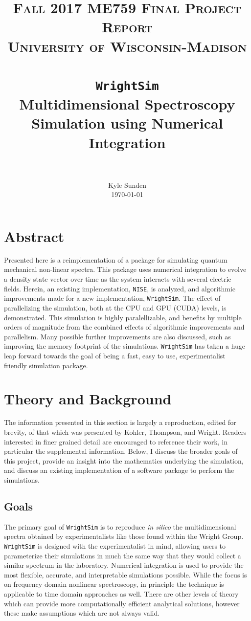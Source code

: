 \documentclass[fontsize=11pt]{scrartcl}
\title{
		\vspace{1in} 	
		\usefont{OT1}{bch}{b}{n}
		\normalfont \normalsize \textsc{Fall 2017 ME759 Final Project Report} \\ [25pt]
		\normalfont \normalsize \textsc{University of Wisconsin-Madison} \\ [25pt]
		\vspace{1.5in} 	
		\horrule{0.5pt} \\[0.4cm]
		\huge \texttt{WrightSim} \\
        \vspace{0.5in}
		\large Multidimensional Spectroscopy Simulation using Numerical Integration \\
		\horrule{2pt} \\[0.5cm]
}
\author{
		\vspace{1.5in} 	
		\normalfont 								\normalsize
        Kyle Sunden\\[-3pt]		\normalsize
        \today
}
\date{}
\numberwithin{equation}{section}		%
\numberwithin{figure}{section}			%
\numberwithin{table}{section}				%
\begin{document}
\maketitle
\newpage
\section*{Abstract}

Presented here is a reimplementation of a package for simulating quantum mechanical non-linear spectra.
This package uses numerical integration to evolve a density state vector over time as the system interacts with several electric fields.
Herein, an existing implementation, \texttt{NISE}, is analyzed, and algorithmic improvements made for a new implementation, \texttt{WrightSim}.
The effect of parallelizing the simulation, both at the CPU and GPU (CUDA) levels, is demonstrated.
This simulation is highly paralellizable, and benefits by multiple orders of magnitude from the combined effects of algorithmic improvements and parallelism.
Many possible further improvements are also discussed, such as improving the memory footprint of the simulations.
\texttt{WrightSim} has taken a huge leap forward towards the goal of being a fast, easy to use, experimentalist friendly simulation package.


\newpage
\tableofcontents
\newpage
\section{Theory and Background}
The information presented in this section is largely a reproduction, edited for brevity, of that which was presented by Kohler, Thompson, and Wright\cite{Kohler_2017}.
Readers interested in finer grained detail are encouraged to reference their work, in particular the supplemental information.
Below, I discuss the broader goals of this project, provide an insight into the mathematics underlying the simulation, and discuss an existing implementation of a software package to perform the simulations.

\subsection{Goals}
The primary goal of \texttt{WrightSim} is to reproduce \textit{in silico} the multidimensional spectra obtained by experimentalists like those found within the Wright Group.
\texttt{WrightSim} is designed with the experimentalist in mind, allowing users to parameterize their simulations in much the same way that they would collect a similar spectrum in the laboratory.
Numerical integration is used to provide the most flexible, accurate, and interpretable simulations possible.
While the focus is on frequency domain nonlinear spectroscopy, in principle the technique is applicable to time domain approaches as well.
There are other levels of theory which can provide more computationally efficient analytical solutions, however these make assumptions which are not always valid.
\end{document}
